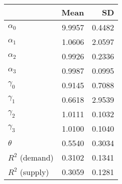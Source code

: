 
\begin{tabular}[t]{lrr}
\toprule
  & Mean & SD\\
\midrule
$\alpha_{0}$ & 9.9957 & 0.4482\\
$\alpha_{1}$ & 1.0606 & 2.0597\\
$\alpha_{2}$ & 0.9926 & 0.2336\\
$\alpha_{3}$ & 0.9987 & 0.0995\\
$\gamma_{0}$ & 0.9145 & 0.7088\\
$\gamma_{1}$ & 0.6618 & 2.9539\\
$\gamma_{2}$ & 1.0111 & 0.1032\\
$\gamma_{3}$ & 1.0100 & 0.1040\\
$\theta$ & 0.5540 & 0.3034\\
$R^{2}$ (demand) & 0.3102 & 0.1341\\
$R^{2}$ (supply) & 0.3059 & 0.1281\\
\bottomrule
\end{tabular}
